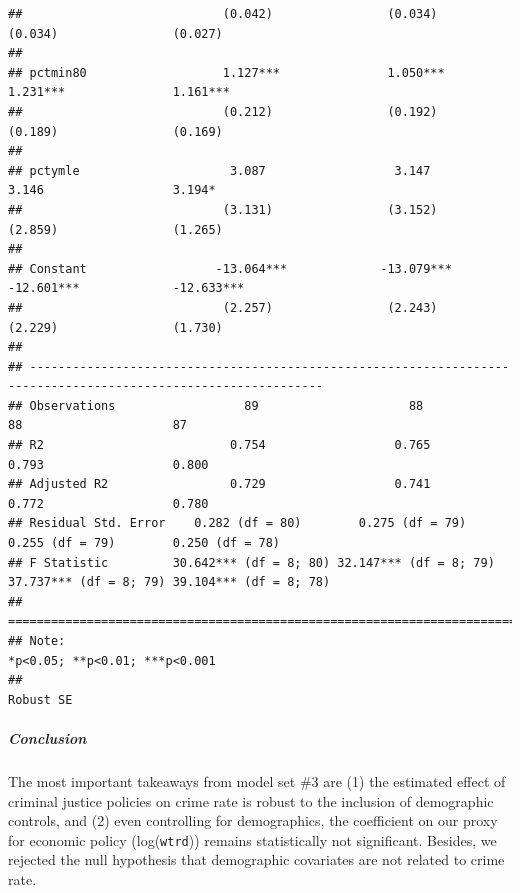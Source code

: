 \documentclass[]{article}
\let\oldsubparagraph\subparagraph
\renewcommand{\subparagraph}[1]{\oldsubparagraph{#1}\mbox{}}
\begin{document}
\begin{verbatim}
##                            (0.042)                (0.034)                (0.034)                (0.027)        
##                                                                                                                
## pctmin80                   1.127***               1.050***               1.231***               1.161***       
##                            (0.212)                (0.192)                (0.189)                (0.169)        
##                                                                                                                
## pctymle                     3.087                  3.147                  3.146                  3.194*        
##                            (3.131)                (3.152)                (2.859)                (1.265)        
##                                                                                                                
## Constant                  -13.064***             -13.079***             -12.601***             -12.633***      
##                            (2.257)                (2.243)                (2.229)                (1.730)        
##                                                                                                                
## ---------------------------------------------------------------------------------------------------------------
## Observations                  89                     88                     88                     87          
## R2                          0.754                  0.765                  0.793                  0.800         
## Adjusted R2                 0.729                  0.741                  0.772                  0.780         
## Residual Std. Error    0.282 (df = 80)        0.275 (df = 79)        0.255 (df = 79)        0.250 (df = 78)    
## F Statistic         30.642*** (df = 8; 80) 32.147*** (df = 8; 79) 37.737*** (df = 8; 79) 39.104*** (df = 8; 78)
## ===============================================================================================================
## Note:                                                                             *p<0.05; **p<0.01; ***p<0.001
##                                                                                                       Robust SE
\end{verbatim}

\hypertarget{conclusion-2}{%
\subparagraph{Conclusion}\label{conclusion-2}}

The most important takeaways from model set \#3 are (1) the estimated
effect of criminal justice policies on crime rate is robust to the
inclusion of demographic controls, and (2) even controlling for
demographics, the coefficient on our proxy for economic policy
(log(\texttt{wtrd})) remains statistically not significant. Besides, we
rejected the null hypothesis that demographic covariates are not related
to crime rate.
\end{document}
